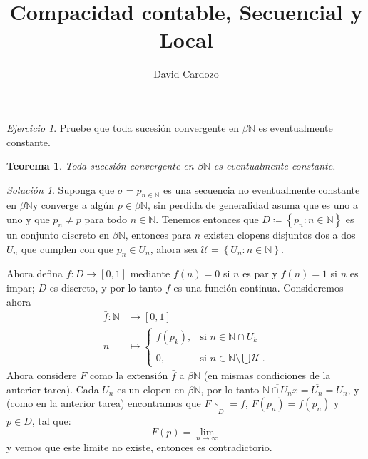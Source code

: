 \documentclass[notitlepage]{report}
\author{David Cardozo}
\title{Compacidad contable, Secuencial y Local}
\newtheorem{thm}{Teorema}
\theoremstyle{definition}
\theoremstyle{remark}
\newtheorem{exc}{Ejercicio}
\newtheorem*{sol}{Solución}
\newcommand{\set}[1]{\left\lbrace #1 \right\rbrace}
\newcommand{\restric}[2]{ #1\restriction_{#2}}
\newcommand{\NN}{\mathbb{N}}
\newcommand{\betan}{\beta \mathbb{N}}
\begin{document}
\maketitle

\begin{exc}
	Pruebe que toda sucesión convergente en $ \beta \NN   $ es eventualmente constante.
\end{exc}
	\begin{thm}
		Toda sucesión convergente en $ \beta \NN   $ es eventualmente constante.
	\end{thm}
\begin{sol}
	Suponga que $ \sigma = p_{n \in \NN} $ es una secuencia no eventualmente constante en $ \betan $y converge a algún $ p \in \betan $, sin perdida de generalidad asuma que es uno a uno y que $ p_n \neq p $ para todo $ n \in \NN $. Tenemos entonces que $ D \coloneqq \set{p_n : n \in \NN} $ es un conjunto discreto en $ \betan $, entonces para $ n $ existen clopens disjuntos dos a dos $ U_n $ que cumplen con que $ p_n \in U_n $, ahora sea $ \mathcal{U} = \set{U_n : n \in \NN} $.
	
	Ahora defina $ f: D \rightarrow [0,1] $ mediante $ f(n) = 0 $ si $ n $ es par y $ f(n) = 1 $ si $ n  $ es impar; $ D $ es discreto, y por lo tanto $ f $ es una función continua. Consideremos ahora 
	\begin{align*}
	\bar{f}: \mathbb{N} &\rightarrow [0,1] \\
	n&\mapsto\begin{cases}
	f(p_k),&\text{si }n\in\NN\cap U_k\\\\
	0,&\text{si }n\in\NN\setminus\bigcup\mathcal{U}\;.
	\end{cases}
	\end{align*}
	Ahora considere $ F $ como la extensión $ \bar{f} $  a $ \betan $ (en mismas condiciones de la anterior tarea). Cada $ U_n $ es un clopen en $ \betan $, por lo tanto $ \overline{\NN \cap U_n}x = \overline{U_n} = U_n $, y (como en la anterior tarea) encontramos que $  \restric{F}{D} = f $, $ F(p_n) = f(p_n) $ y $ p \in \overline{D} $, tal que:
	\[ F(p) = \lim\limits_{n \rightarrow \infty} \]
	y vemos que este limite no existe, entonces es contradictorio.
\end{sol}
\end{document}
